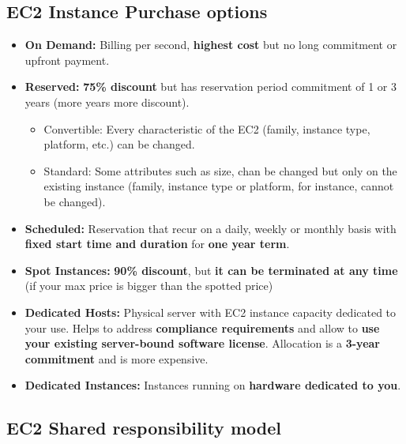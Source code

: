 \subsection{EC2 Instance Purchase options}\label{subsec:ec2-instance-purchase-options}
\begin{itemize}
	\item \textbf{On Demand:} Billing per second, \textbf{highest cost} but no long commitment or upfront payment.
	\item \textbf{Reserved:} \textbf{75\% discount} but has reservation period commitment of 1 or 3 years (more years more discount).
	\begin{itemize}
		\item {Convertible:} Every characteristic of the EC2 (family, instance type, platform, etc.) can be changed.
		\item {Standard:} Some attributes such as size, chan be changed but only on the existing instance (family, instance type or platform, for instance, cannot be changed).
	\end{itemize}
	\item \textbf{Scheduled:} Reservation that recur on a daily, weekly or monthly basis with \textbf{fixed start time and duration} for \textbf{one year term}.
	\item \textbf{Spot Instances:} \textbf{90\% discount}, but \textbf{it can be terminated at any time} (if your max price is bigger than the spotted price)
	\item \textbf{Dedicated Hosts:} Physical server with EC2 instance capacity dedicated to your use.
	Helps to address \textbf{compliance requirements} and allow to \textbf{use your existing server-bound software license}.
	Allocation is a \textbf{3-year commitment} and is more expensive.
	\item \textbf{Dedicated Instances:} Instances running on \textbf{hardware dedicated to you}.
\end{itemize}

\subsection{EC2 Shared responsibility model}\label{subsec:ec2-shared-responsibility-model}


